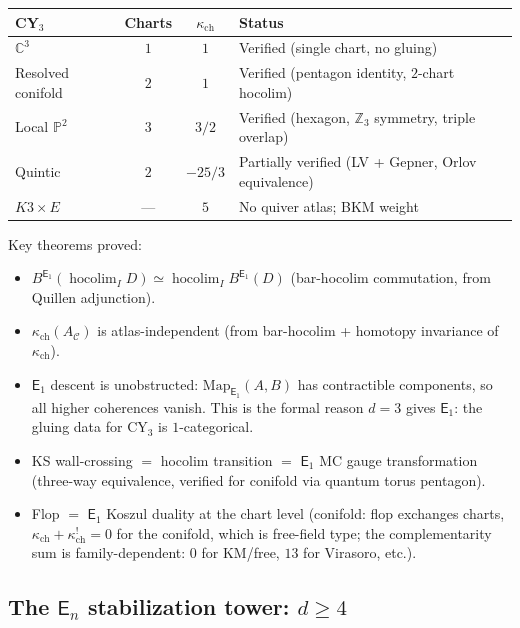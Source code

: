 \documentclass[11pt]{article}
\newcommand{\cC}{\mathcal{C}}
\newcommand{\C}{\mathbb{C}}
\newcommand{\Z}{\mathbb{Z}}
\newcommand{\bP}{\mathbb{P}}
\newcommand{\Eone}{\mathsf{E}_1}
\newcommand{\En}{\mathsf{E}_n}
\begin{document}
\begin{center}
\renewcommand{\arraystretch}{1.2}
\small
\begin{tabular}{lccl}
 \toprule
 \textbf{CY$_3$} & Charts & $\kappa_{\mathrm{ch}}$ & Status \\
 \midrule
 $\C^3$ & $1$ & $1$ & Verified (single chart, no gluing) \\
 Resolved conifold & $2$ & $1$ & Verified (pentagon identity, $2$-chart hocolim) \\
 Local $\bP^2$ & $3$ & $3/2$ & Verified (hexagon, $\Z_3$ symmetry, triple overlap) \\
 Quintic & $2$ & $-25/3$ & Partially verified (LV + Gepner, Orlov equivalence) \\
 $K3 \times E$ & --- & $5$ & No quiver atlas; BKM weight \\
 \bottomrule
\end{tabular}
\end{center}

\noindent Key theorems proved:
\begin{itemize}
\item $B^{\Eone}(\operatorname{hocolim}_I D) \simeq \operatorname{hocolim}_I B^{\Eone}(D)$
 (bar-hocolim commutation, from Quillen adjunction).
\item $\kappa_{\mathrm{ch}}(A_\cC)$ is atlas-independent (from bar-hocolim + homotopy invariance of $\kappa_{\mathrm{ch}}$).
\item $\Eone$ descent is unobstructed: $\mathrm{Map}_{\Eone}(A, B)$ has contractible components,
 so all higher coherences vanish. This is the formal reason $d = 3$ gives $\Eone$: the
 gluing data for CY$_3$ is $1$-categorical.
\item KS wall-crossing $=$ hocolim transition $=$ $\Eone$ MC gauge transformation (three-way equivalence,
 verified for conifold via quantum torus pentagon).
\item Flop $=$ $\Eone$ Koszul duality at the chart level (conifold: flop exchanges charts,
 $\kappa_{\mathrm{ch}} + \kappa_{\mathrm{ch}}^! = 0$ for the conifold, which is free-field type; the complementarity sum is family-dependent: $0$ for KM/free, $13$ for Virasoro, etc.).
\end{itemize}

\subsection{The $\En$ stabilization tower: $d \geq 4$}
\label{subsec:en-stabilization}
\end{document}
